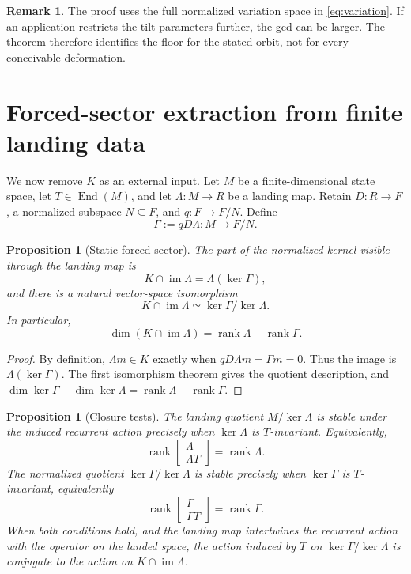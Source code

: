 \documentclass[11pt]{article}
\newtheorem{proposition}[theorem]{Proposition}
\theoremstyle{definition}
\newtheorem{remark}[theorem]{Remark}
\newcommand{\im}{\operatorname{im}}
\newcommand{\End}{\operatorname{End}}
\newcommand{\rankp}{\operatorname{rank}}
\begin{document}
\begin{remark}
The proof uses the full normalized variation space in \eqref{eq:variation}. If an application
restricts the tilt parameters further, the gcd can be larger. The theorem therefore identifies the
floor for the stated orbit, not for every conceivable deformation.
\end{remark}

\section{Forced-sector extraction from finite landing data}

We now remove \(K\) as an external input. Let \(M\) be a finite-dimensional state space, let
\(T\in\End(M)\), and let \(\Lambda:M\to R\) be a landing map. Retain \(D:R\to F\), a normalized
subspace \(N\subseteq F\), and \(q:F\to F/N\). Define
\begin{equation}
\Gamma:=qD\Lambda:M\longrightarrow F/N.
\label{eq:Gamma}
\end{equation}

\begin{proposition}[Static forced sector]
The part of the normalized kernel visible through the landing map is
\[
K\cap\im\Lambda=\Lambda(\ker\Gamma),
\]
and there is a natural vector-space isomorphism
\begin{equation}
K\cap\im\Lambda\simeq\ker\Gamma/\ker\Lambda.
\label{eq:quotient}
\end{equation}
In particular,
\begin{equation}
\dim(K\cap\im\Lambda)=\rankp\Lambda-\rankp\Gamma.
\label{eq:dimension}
\end{equation}
\end{proposition}

\begin{proof}
By definition, \(\Lambda m\in K\) exactly when \(qD\Lambda m=\Gamma m=0\). Thus the image is
\(\Lambda(\ker\Gamma)\). The first isomorphism theorem gives the quotient description, and
\(\dim\ker\Gamma-\dim\ker\Lambda=\rankp\Lambda-\rankp\Gamma\).
\end{proof}

\begin{proposition}[Closure tests]
The landing quotient \(M/\ker\Lambda\) is stable under the induced recurrent action precisely when
\(\ker\Lambda\) is \(T\)-invariant. Equivalently,
\[
\rankp\begin{bmatrix}\Lambda\\\Lambda T\end{bmatrix}=\rankp\Lambda.
\]
The normalized quotient \(\ker\Gamma/\ker\Lambda\) is stable precisely when \(\ker\Gamma\) is
\(T\)-invariant, equivalently
\[
\rankp\begin{bmatrix}\Gamma\\\Gamma T\end{bmatrix}=\rankp\Gamma.
\]
When both conditions hold, and the landing map intertwines the recurrent action with the operator on
the landed space, the action induced by \(T\) on \(\ker\Gamma/\ker\Lambda\) is conjugate to the
action on \(K\cap\im\Lambda\).
\end{proposition}
\end{document}
